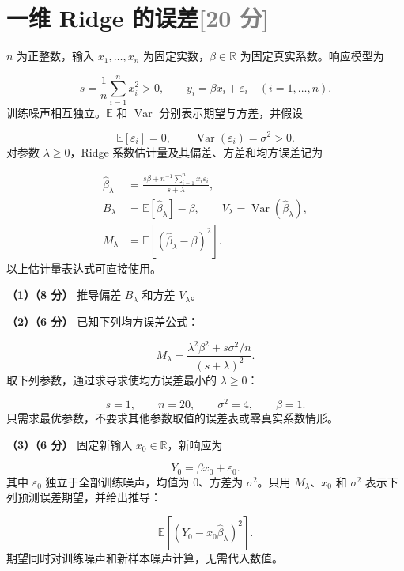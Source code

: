 \documentclass[11pt,a4paper]{article}
\begin{document}
\par\addvspace{1.2em}\noindent\begin{minipage}{\linewidth}
\section[一维 Ridge 的误差（20 分）]{一维 Ridge 的误差\hfill\textcolor{gray}{[20 分]}}
$n$ 为正整数，输入 $x_1,\ldots,x_n$ 为固定实数，$\beta\in\mathbb R$ 为固定真实系数。响应模型为


\[
s=\frac1n\sum_{i=1}^nx_i^2>0,\qquad
y_i=\beta x_i+\varepsilon_i\quad(i=1,\ldots,n).
\]
训练噪声相互独立。$\mathbb E$ 和 $\operatorname{Var}$ 分别表示期望与方差，并假设


\[
\mathbb E[\varepsilon_i]=0,\qquad
\operatorname{Var}(\varepsilon_i)=\sigma^2>0.
\]
对参数 $\lambda\geq0$，Ridge 系数估计量及其偏差、方差和均方误差记为


\[
\begin{aligned}
\widehat\beta_\lambda
&=\frac{s\beta+n^{-1}\sum_{i=1}^nx_i\varepsilon_i}{s+\lambda},\\
B_\lambda&=\mathbb E[\widehat\beta_\lambda]-\beta,\qquad
V_\lambda=\operatorname{Var}(\widehat\beta_\lambda),\\
M_\lambda&=\mathbb E[(\widehat\beta_\lambda-\beta)^2].
\end{aligned}
\]
以上估计量表达式可直接使用。

\textbf{（1）（8 分）} 推导偏差 $B_\lambda$ 和方差 $V_\lambda$。

\textbf{（2）（6 分）} 已知下列均方误差公式：


\[
M_\lambda=\frac{\lambda^2\beta^2+s\sigma^2/n}{(s+\lambda)^2}.
\]
取下列参数，通过求导求使均方误差最小的 $\lambda\geq0$：


\[
s=1,\qquad n=20,\qquad \sigma^2=4,\qquad \beta=1.
\]
只需求最优参数，不要求其他参数取值的误差表或零真实系数情形。

\textbf{（3）（6 分）} 固定新输入 $x_0\in\mathbb R$，新响应为


\[
Y_0=\beta x_0+\varepsilon_0.
\]
其中 $\varepsilon_0$ 独立于全部训练噪声，均值为 $0$、方差为 $\sigma^2$。只用 $M_\lambda$、$x_0$ 和 $\sigma^2$ 表示下列预测误差期望，并给出推导：


\[
\mathbb E[(Y_0-x_0\widehat\beta_\lambda)^2].
\]
期望同时对训练噪声和新样本噪声计算，无需代入数值。


\end{minipage}\par
\end{document}
